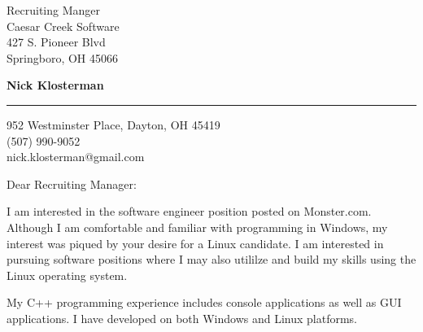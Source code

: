 \documentclass{letter} %
\begin{document}
\signature{Nick Klosterman}           %
\longindentation=0pt                       %
\let\raggedleft\raggedright                %
 
 
\begin{letter}{Recruiting Manger \\
Caesar Creek Software \\
427 S. Pioneer Blvd \\
Springboro, OH 45066 \\
}

  \begin{flushright}
 \hfill   \large\bf Nick Klosterman  \\
\end{flushright}
\begin{flushright}
    \medskip\hrule height 1pt
    \hfill 952 Westminster Place, Dayton, OH 45419 \\
    \hfill (507) 990-9052 \\
    \hfill nick.klosterman@gmail.com
  \end{flushright} 
\vfill %

 
\opening{Dear Recruiting Manager:} 

\noindent 
I am interested in the software engineer position posted on Monster.com. 
Although I am comfortable and familiar with programming in Windows, my interest was piqued by your desire for a Linux candidate.
I am interested in pursuing software positions where I may also utililze and build my skills using the Linux operating system.

\noindent
My C++ programming experience includes console applications as well as GUI applications.
I have developed on both Windows and Linux platforms. 


\end{letter}
\end{document}
